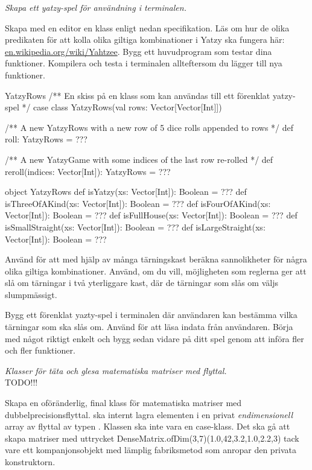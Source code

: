 \ExtraTasks %

\Task \emph{Skapa ett yatzy-spel för användning i terminalen.}

\Subtask Skapa med en editor en klass enligt nedan specifikation. Läs om hur de olika predikaten för att kolla olika giltiga kombinationer i Yatzy ska fungera här: \href{https://en.wikipedia.org/wiki/Yahtzee}{en.wikipedia.org/wiki/Yahtzee}. Bygg ett huvudprogram som testar dina funktioner. Kompilera och testa i terminalen allteftersom du lägger till nya funktioner.

\begin{ScalaSpec}{YatzyRows}
/** En skiss på en klass som kan användas till ett förenklat yatzy-spel */
case class YatzyRows(val rows: Vector[Vector[Int]]) {
  /** A new YatzyRows with a new row of 5 dice rolls appended to rows  */
  def roll: YatzyRows = ???

  /** A new YatzyGame with some indices of the last row re-rolled  */
  def reroll(indices: Vector[Int]): YatzyRows = ???
}

object YatzyRows {
  def isYatzy(xs: Vector[Int]): Boolean = ???
  def isThreeOfAKind(xs: Vector[Int]): Boolean = ???
  def isFourOfAKind(xs: Vector[Int]): Boolean = ???
  def isFullHouse(xs: Vector[Int]): Boolean = ???
  def isSmallStraight(xs: Vector[Int]): Boolean = ???
  def isLargeStraight(xs: Vector[Int]): Boolean = ???
}
\end{ScalaSpec}


\Subtask Använd  för att med hjälp av många tärningskast beräkna sannolikheter för några olika giltiga kombinationer. Använd, om du vill, möjligheten som reglerna ger att slå om tärningar i två yterliggare kast, där de tärningar som slås om väljs slumpmässigt.

\Subtask Bygg ett förenklat yazty-spel i terminalen där användaren kan bestämma vilka tärningar som ska slås om. Använd  för att läsa indata från användaren. Börja med något riktigt enkelt och bygg sedan vidare på ditt spel genom att införa fler och fler funktioner.



\AdvancedTasks %


\Task \emph{Klasser för täta och glesa matematiska matriser med flyttal.} \\TODO!!!

\Subtask Skapa en oföränderlig, final klass  för matematiska matriser med dubbelprecisionsflyttal.  ska internt lagra elementen i en privat \emph{endimensionell} array av flyttal av typen . Klassen ska inte vara en case-klass. Det ska gå att skapa matriser med uttrycket DenseMatrix.ofDim(3,7)(1.0,42,3.2,1.0,2.2,3) tack vare ett kompanjonsobjekt med lämplig fabriksmetod som anropar den privata konstruktorn. 


